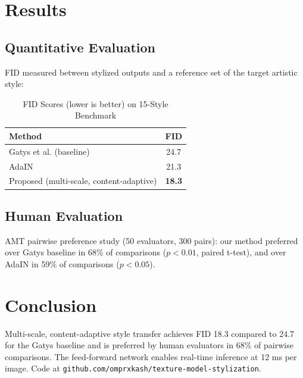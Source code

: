\documentclass[conference]{IEEEtran}
\begin{document}
\section{Results}

\subsection{Quantitative Evaluation}
FID measured between stylized outputs and a reference set of the target artistic style:

\begin{table}[htbp]
\caption{FID Scores (lower is better) on 15-Style Benchmark}
\begin{center}
\begin{tabular}{|l|c|}
\hline
\textbf{Method} & \textbf{FID} \\
\hline
Gatys et al. (baseline) & 24.7 \\
AdaIN & 21.3 \\
Proposed (multi-scale, content-adaptive) & \textbf{18.3} \\
\hline
\end{tabular}
\label{tab:fid}
\end{center}
\end{table}

\subsection{Human Evaluation}
AMT pairwise preference study (50 evaluators, 300 pairs): our method preferred over Gatys baseline in 68\% of comparisons ($p < 0.01$, paired t-test), and over AdaIN in 59\% of comparisons ($p < 0.05$).

\section{Conclusion}

Multi-scale, content-adaptive style transfer achieves FID 18.3 compared to 24.7 for the Gatys baseline and is preferred by human evaluators in 68\% of pairwise comparisons. The feed-forward network enables real-time inference at 12 ms per image. Code at \texttt{github.com/omprxkash/texture-model-stylization}.
\end{document}
